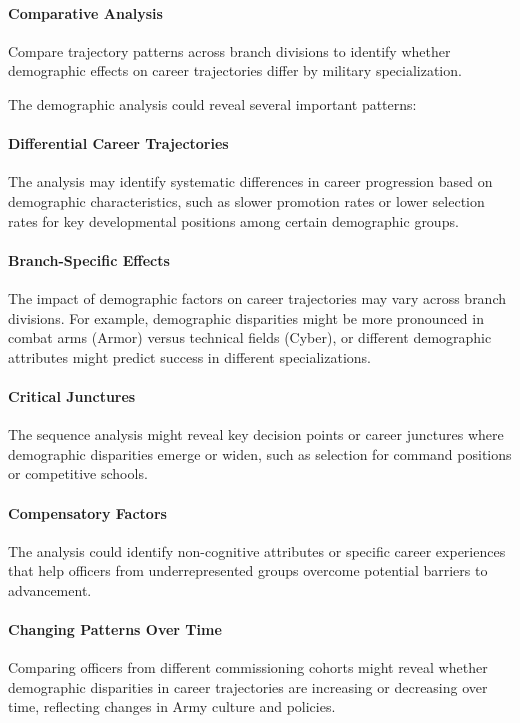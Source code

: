 \documentclass[../main.tex]{subfiles}
\begin{document}
\paragraph{Comparative Analysis} Compare trajectory patterns across branch divisions to identify whether demographic effects on career trajectories differ by military specialization.


The demographic analysis could reveal several important patterns:

\paragraph{Differential Career Trajectories} The analysis may identify systematic differences in career progression based on demographic characteristics, such as slower promotion rates or lower selection rates for key developmental positions among certain demographic groups.

\paragraph{Branch-Specific Effects} The impact of demographic factors on career trajectories may vary across branch divisions. For example, demographic disparities might be more pronounced in combat arms (Armor) versus technical fields (Cyber), or different demographic attributes might predict success in different specializations.

\paragraph{Critical Junctures} The sequence analysis might reveal key decision points or career junctures where demographic disparities emerge or widen, such as selection for command positions or competitive schools.

\paragraph{Compensatory Factors} The analysis could identify non-cognitive attributes or specific career experiences that help officers from underrepresented groups overcome potential barriers to advancement.

\paragraph{Changing Patterns Over Time} Comparing officers from different commissioning cohorts might reveal whether demographic disparities in career trajectories are increasing or decreasing over time, reflecting changes in Army culture and policies.
\end{document}
